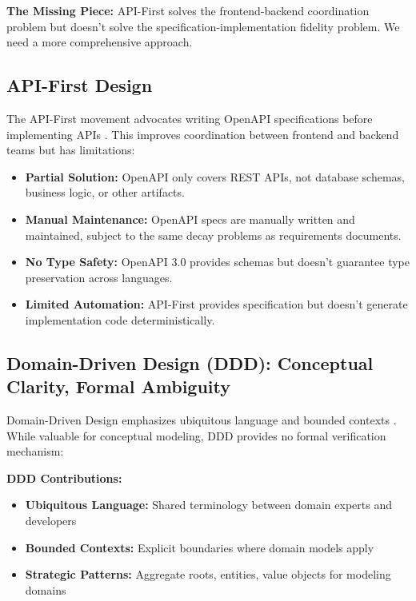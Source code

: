 \textbf{The Missing Piece:} API-First solves the frontend-backend coordination problem but doesn't solve the specification-implementation fidelity problem. We need a more comprehensive approach.

\subsection{API-First Design}

The API-First movement advocates writing OpenAPI specifications before implementing APIs \cite{api-first2018}. This improves coordination between frontend and backend teams but has limitations:

\begin{itemize}
    \item \textbf{Partial Solution:} OpenAPI only covers REST APIs, not database schemas, business logic, or other artifacts.
    \item \textbf{Manual Maintenance:} OpenAPI specs are manually written and maintained, subject to the same decay problems as requirements documents.
    \item \textbf{No Type Safety:} OpenAPI 3.0 provides schemas but doesn't guarantee type preservation across languages.
    \item \textbf{Limited Automation:} API-First provides specification but doesn't generate implementation code deterministically.
\end{itemize}

\subsection{Domain-Driven Design (DDD): Conceptual Clarity, Formal Ambiguity}

Domain-Driven Design emphasizes ubiquitous language and bounded contexts \cite{evans2003ddd}. While valuable for conceptual modeling, DDD provides no formal verification mechanism:

\textbf{DDD Contributions:}
\begin{itemize}
    \item \textbf{Ubiquitous Language:} Shared terminology between domain experts and developers
    \item \textbf{Bounded Contexts:} Explicit boundaries where domain models apply
    \item \textbf{Strategic Patterns:} Aggregate roots, entities, value objects for modeling domains
\end{itemize}

